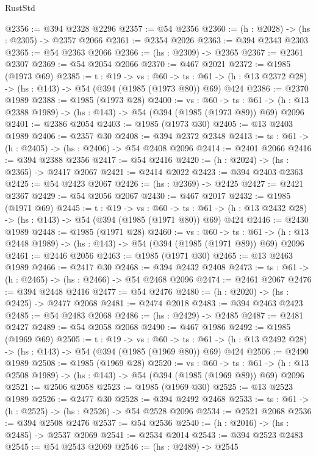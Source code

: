 \begin{lexlean}{RustStd}
\begin{coremodule}
{\begin{coremodule}
{{{{{{{{@2356 := @394 @2328 @2296
@2357 := @54 @2356
@2360 := (h : @2028) -> (hs : @2305) -> @2357 @2066
@2361 := @2354 @2026
@2363 := @394 @2343 @2303
@2365 := @54 @2363 @2066
@2366 := (hs : @2309) -> @2365
@2367 := @2361 @2307
@2369 := @54 @2054 @2066
@2370 := @467 @2021
@2372 := @1985 (@1973 @69)
@2385 := {t : @19} ->
  {vs : @60} ->
  {ts : @61} -> (h : @13 @2372 @28) -> (hs : @143) -> @54 (@394 (@1985 (@1973 @80)) @69) @424
@2386 := @2370 @1989
@2388 := @1985 (@1973 @28)
@2400 := {vs : @60} ->
  {ts : @61} -> (h : @13 @2388 @1989) -> (hs : @143) -> @54 (@394 (@1985 (@1973 @89)) @69) @2096
@2401 := @2386 @2054
@2403 := @1985 (@1973 @30)
@2405 := @13 @2403 @1989
@2406 := @2357 @30
@2408 := @394 @2372 @2348
@2413 := {ts : @61} -> (h : @2405) -> (hs : @2406) -> @54 @2408 @2096
@2414 := @2401 @2066
@2416 := @394 @2388 @2356
@2417 := @54 @2416
@2420 := (h : @2024) -> (hs : @2365) -> @2417 @2067
@2421 := @2414 @2022
@2423 := @394 @2403 @2363
@2425 := @54 @2423 @2067
@2426 := (hs : @2369) -> @2425
@2427 := @2421 @2367
@2429 := @54 @2056 @2067
@2430 := @467 @2017
@2432 := @1985 (@1971 @69)
@2445 := {t : @19} ->
  {vs : @60} ->
  {ts : @61} -> (h : @13 @2432 @28) -> (hs : @143) -> @54 (@394 (@1985 (@1971 @80)) @69) @424
@2446 := @2430 @1989
@2448 := @1985 (@1971 @28)
@2460 := {vs : @60} ->
  {ts : @61} -> (h : @13 @2448 @1989) -> (hs : @143) -> @54 (@394 (@1985 (@1971 @89)) @69) @2096
@2461 := @2446 @2056
@2463 := @1985 (@1971 @30)
@2465 := @13 @2463 @1989
@2466 := @2417 @30
@2468 := @394 @2432 @2408
@2473 := {ts : @61} -> (h : @2465) -> (hs : @2466) -> @54 @2468 @2096
@2474 := @2461 @2067
@2476 := @394 @2448 @2416
@2477 := @54 @2476
@2480 := (h : @2020) -> (hs : @2425) -> @2477 @2068
@2481 := @2474 @2018
@2483 := @394 @2463 @2423
@2485 := @54 @2483 @2068
@2486 := (hs : @2429) -> @2485
@2487 := @2481 @2427
@2489 := @54 @2058 @2068
@2490 := @467 @1986
@2492 := @1985 (@1969 @69)
@2505 := {t : @19} ->
  {vs : @60} ->
  {ts : @61} -> (h : @13 @2492 @28) -> (hs : @143) -> @54 (@394 (@1985 (@1969 @80)) @69) @424
@2506 := @2490 @1989
@2508 := @1985 (@1969 @28)
@2520 := {vs : @60} ->
  {ts : @61} -> (h : @13 @2508 @1989) -> (hs : @143) -> @54 (@394 (@1985 (@1969 @89)) @69) @2096
@2521 := @2506 @2058
@2523 := @1985 (@1969 @30)
@2525 := @13 @2523 @1989
@2526 := @2477 @30
@2528 := @394 @2492 @2468
@2533 := {ts : @61} -> (h : @2525) -> (hs : @2526) -> @54 @2528 @2096
@2534 := @2521 @2068
@2536 := @394 @2508 @2476
@2537 := @54 @2536
@2540 := (h : @2016) -> (hs : @2485) -> @2537 @2069
@2541 := @2534 @2014
@2543 := @394 @2523 @2483
@2545 := @54 @2543 @2069
@2546 := (hs : @2489) -> @2545
}}}}}}}}
\end{coremodule}}
\end{coremodule}
\end{lexlean}
